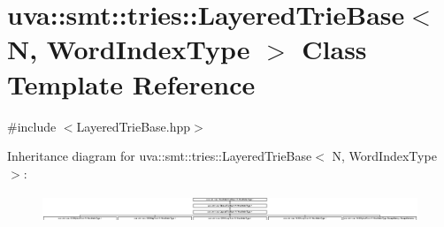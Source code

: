 \hypertarget{classuva_1_1smt_1_1tries_1_1_layered_trie_base}{}\section{uva\+:\+:smt\+:\+:tries\+:\+:Layered\+Trie\+Base$<$ N, Word\+Index\+Type $>$ Class Template Reference}
\label{classuva_1_1smt_1_1tries_1_1_layered_trie_base}


{\ttfamily \#include $<$Layered\+Trie\+Base.\+hpp$>$}

Inheritance diagram for uva\+:\+:smt\+:\+:tries\+:\+:Layered\+Trie\+Base$<$ N, Word\+Index\+Type $>$\+:\begin{figure}[H]
\begin{center}
\leavevmode
\includegraphics[height=0.856597cm]{classuva_1_1smt_1_1tries_1_1_layered_trie_base}
\end{center}
\end{figure}
